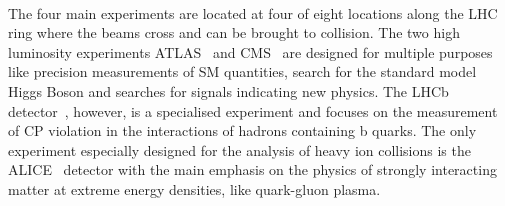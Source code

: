 \\
The four main experiments are located at four of eight locations along the LHC ring where the beams cross and can be brought to collision. The two high luminosity experiments ATLAS~\cite{det::ATLAS} and CMS~\cite{Chatrchyan:2008zzk, bib:cmsptdr1} are designed for multiple purposes like precision measurements of SM quantities, search for the standard model Higgs Boson and searches for signals indicating new physics. The LHCb detector~\cite{det::LHCb}, however, is a specialised experiment and focuses on the measurement of CP violation in the interactions of hadrons containing b quarks. The only experiment especially designed for the analysis of heavy ion collisions is the ALICE~\cite{det::ALICE} detector with the main emphasis on the physics of strongly interacting matter at extreme energy densities, like quark-gluon plasma.

